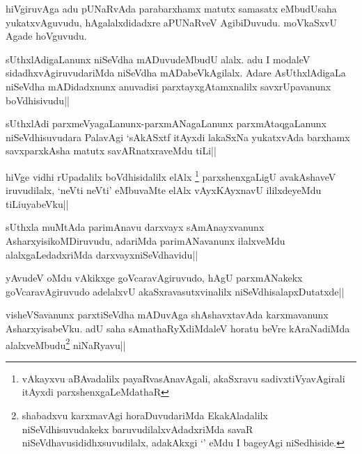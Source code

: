 
\begin{artha}
hiVgiruvAga adu pUNaRvAda parabarxhamx matutx samasatx eMbudUsaha yukatxvAguvudu, hAgalalxdidadxre aPUNaRveV AgibiDuvudu. moVkaSxvU Agade hoVguvudu. 
\end{artha}


\begin{artha}
sUthxlAdigaLanunx niSeVdha mADuvudeMbudU alalx. adu I modaleV sidadhxvAgiruvudariMda niSeVdha mADabeVkAgilalx. Adare AsUthxlAdigaLa niSeVdha mADidadxnunx anuvadisi parxtayxgAtamxnalilx savxrUpavanunx boVdhisivudu||
\end{artha}

\begin{artha}
sUthxlAdi parxmeVyagaLanunx-parxmANagaLanunx parxmAtaqgaLanunx niSeVdhisuvudara PalavAgi `sAkASxtf itAyxdi lakaSxNa yukatxvAda barxhamx savxparxkAsha matutx savARnatxraveMdu tiLi||
\end{artha}

\begin{artha}
hiVge vidhi rUpadalilx boVdhisidalilx elAlx \footnote[1]{vAkayxvu aBAvadalilx payaRvasAnavAgali, akaSxravu sadivxtiVyavAgirali itAyxdi parxshenxgaLeMdathaR} parxshenxgaLigU avakAshaveV iruvudilalx, `neVti neVti' eMbuvaMte elAlx vAyxKAyxnavU ililxdeyeMdu tiLiuyabeVku||
\end{artha}%

\begin{artha}
sUthxla muMtAda parimAnavu darxvayx sAmAnayxvanunx AsharxyisikoMDiruvudu, adariMda parimANavanunx ilalxveMdu alalxgaLedadxriMda darxvayxniSeVdhavidu||
\end{artha}

\begin{artha}
yAvudeV oMdu vAkikxge goVcaravAgiruvudo, hAgU parxmANakekx goVcaravAgiruvudo adelalxvU akaSxravasutxvinalilx niSeVdhisalapxDutatxde||
\end{artha}


\begin{artha}
visheVSavanunx parxtiSeVdha mADuvAga shAshavxtavAda karxmavanunx AsharxyisabeVku. adU saha sAmathaRyXdiMdaleV horatu beVre kAraNadiMda alalxveMbudu\footnote[1]{shabadxvu karxmavAgi horaDuvudariMda EkakAladalilx niSeVdhisuvudakekx baruvudilalxvAdadxriMda savaR niSeVdhavusididhxsuvudilalx, adakAkxgi `\stext ' eMdu I bageyAgi niSedhiside.} niNaRyavu||
\end{artha}

